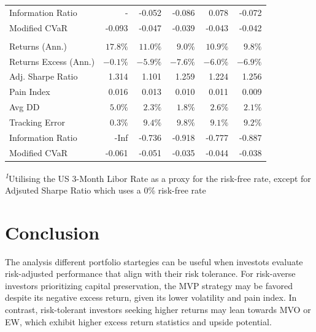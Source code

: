 \documentclass[12pt,preprint, authoryear]{elsarticle}
\numberwithin{equation}{section}
\numberwithin{figure}{section}
\numberwithin{table}{section}
\begin{document}
\begin{longtable}{lrrrrr}
Information Ratio & - & -0.052 & -0.086 & 0.078 & -0.072 \\ 
Modified CVaR & -0.093 & -0.047 & -0.039 & -0.043 & -0.042 \\ 
\midrule\addlinespace[2.5pt]
\multicolumn{6}{l}{Low Volatility Brent Movements} \\ 
\midrule\addlinespace[2.5pt]
Returns (Ann.) & $17.8\%$ & $11.0\%$ & $9.0\%$ & $10.9\%$ & $9.8\%$ \\ 
Returns Excess (Ann.) & $-0.1\%$ & $-5.9\%$ & $-7.6\%$ & $-6.0\%$ & $-6.9\%$ \\ 
Adj. Sharpe Ratio & 1.314 & 1.101 & 1.259 & 1.224 & 1.256 \\ 
Pain Index & 0.016 & 0.013 & 0.010 & 0.011 & 0.009 \\ 
Avg DD & $5.0\%$ & $2.3\%$ & $1.8\%$ & $2.6\%$ & $2.1\%$ \\ 
Tracking Error & $0.3\%$ & $9.4\%$ & $9.8\%$ & $9.1\%$ & $9.2\%$ \\ 
Information Ratio & -Inf & -0.736 & -0.918 & -0.777 & -0.887 \\ 
Modified CVaR & -0.061 & -0.051 & -0.035 & -0.044 & -0.038 \\ 
\bottomrule
\end{longtable}
\begin{minipage}{\linewidth}
\textsuperscript{\textit{1}}Utilising the US 3-Month Libor Rate as a proxy for the risk-free rate, except for Adjsuted Sharpe Ratio which uses a 0\% risk-free rate\\
\end{minipage}

\hypertarget{conclusion}{%
\section*{Conclusion}\label{conclusion}}

The analysis different portfolio startegies can be useful when investots
evaluate risk-adjusted performance that align with their risk tolerance.
For risk-averse investors prioritizing capital preservation, the MVP
strategy may be favored despite its negative excess return, given its
lower volatility and pain index. In contrast, risk-tolerant investors
seeking higher returns may lean towards MVO or EW, which exhibit higher
excess return statistics and upside potential.

\hfill

\newpage

\newpage
\end{document}

